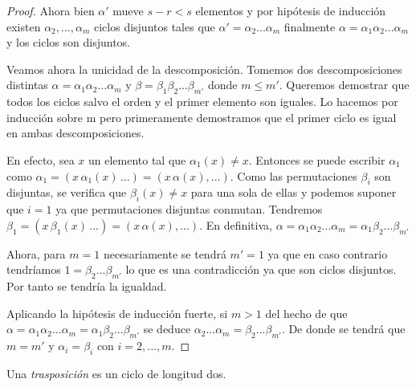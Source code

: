 \begin{proof}
Ahora bien $\alpha'$ mueve $s-r < s$ elementos y por hipótesis de inducción existen $\alpha_2,...,\alpha_m$ ciclos disjuntos tales que $\alpha' = \alpha_2...\alpha_m$ finalmente $\alpha = \alpha_1\alpha_2...\alpha_m$ y los ciclos son disjuntos.

Veamos ahora la unicidad de la descomposición. Tomemos dos descomposiciones distintas $\alpha = \alpha_1\alpha_2...\alpha_m$ y $\beta = \beta_1\beta_2...\beta_{m'}$ donde $m \le m'$. Queremos demostrar que todos los ciclos salvo el orden y el primer elemento son iguales. Lo hacemos por inducción sobre m pero primeramente demostramos que el primer ciclo es igual en ambas descomposiciones.

En efecto, sea $x$ un elemento tal que $\alpha_1(x) \neq x$. Entonces se puede escribir $\alpha_1$ como $\alpha_1 = (x \, \alpha_1(x) \, ...) = (x \, \alpha(x),...)$. Como las permutaciones $\beta_i$ son disjuntas, se verifica que $\beta_i(x) \neq x$ para una sola de ellas y podemos suponer que $i = 1$ ya que permutaciones disjuntas conmutan. Tendremos $\beta_1 = (x \, \beta_1(x) \, ...) = (x \, \alpha(x),...)$. En definitiva, $\alpha = \alpha_1\alpha_2...\alpha_m = \alpha_1\beta_2...\beta_{m'}$

Ahora, para $m = 1$ necesariamente se tendrá $m' = 1$ ya que en caso contrario tendríamos $1 = \beta_2...\beta_{m'}$ lo que es una contradicción ya que son ciclos disjuntos. Por tanto se tendría la igualdad. 

Aplicando la hipótesis de inducción fuerte, si $m > 1$ del hecho de que $\alpha = \alpha_1\alpha_2...\alpha_m = \alpha_1\beta_2...\beta_{m'}$ se deduce $\alpha_2...\alpha_m = \beta_2...\beta_{m'}$. De donde se tendrá que $m = m'$ y $\alpha_i = \beta_i$ con $i=2,...,m$.
\end{proof}

\begin{ndef}[Trasposición]
Una \textit{trasposición} es un ciclo de longitud dos.
\end{ndef}

